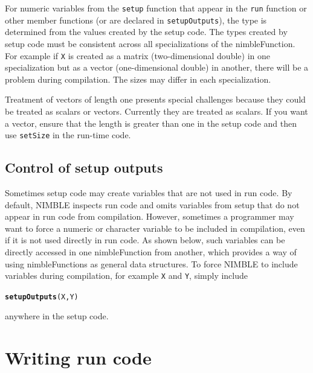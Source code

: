 \documentclass[12pt,oneside]{book}\usepackage[]{graphicx}\usepackage[]{color}
\makeatletter
\newcommand{\hlstd}[1]{\textcolor[rgb]{0.345,0.345,0.345}{#1}}%
\newcommand{\hlkwd}[1]{\textcolor[rgb]{0.737,0.353,0.396}{\textbf{#1}}}%
\newenvironment{kframe}{%
 \def\at@end@of@kframe{}%
 \ifinner\ifhmode%
  \def\at@end@of@kframe{\end{minipage}}%
  \begin{minipage}{\columnwidth}%
 \fi\fi%
 \def\FrameCommand##1{\hskip\@totalleftmargin \hskip-\fboxsep
 \colorbox{shadecolor}{##1}\hskip-\fboxsep
     \hskip-\linewidth \hskip-\@totalleftmargin \hskip\columnwidth}%
 \MakeFramed {\advance\hsize-\width
   \@totalleftmargin\z@ \linewidth\hsize
   \@setminipage}}%
 {\par\unskip\endMakeFramed%
 \at@end@of@kframe}
\newenvironment{knitrout}{}{} %
\def\cd#1{\texttt{#1}}
\makeatother
\begin{document}
For numeric variables from the \cd{setup} function that
  appear in the \cd{run} function or other member functions (or
  are declared in \cd{setupOutputs}), the
  type is determined from the values created by the setup
  code. The types created by setup code must be
  consistent across all specializations of the nimbleFunction.  For
  example if \cd{X} is created as a matrix (two-dimensional double) in one
  specialization but as a vector (one-dimensional double) in another, there
  will be a problem during compilation.  The sizes may differ in each specialization.
  
   Treatment of vectors of length one presents special challenges because
  they could be treated as scalars or vectors.  Currently they are
  treated as scalars.  If you want a vector, ensure that the length is
  greater than one in the setup code and then use \cd{setSize} in the
  run-time code.

\subsection{Control of setup outputs }
\label{sec:determ-pers-texttts}

Sometimes setup code may create variables that are not used in
run code.  By default, NIMBLE inspects run code and omits
variables from setup that do not appear in run code from
compilation.  However, sometimes a programmer may want to force a
numeric or character variable to be included in compilation, even if it
is not used directly in run code.  As shown below, such variables
can be directly accessed in one nimbleFunction from another, which
provides a way of using nimbleFunctions as general data structures.
To force NIMBLE to include variables during compilation, for
example \cd{X} and \cd{Y}, simply include

\begin{knitrout}
\color{fgcolor}\begin{kframe}
\begin{alltt}
\hlkwd{setupOutputs}\hlstd{(X, Y)}
\end{alltt}
\end{kframe}
\end{knitrout}

anywhere in the setup code. 

\section{Writing run code}
\label{sec:nimble-lang-comp}
\end{document}
